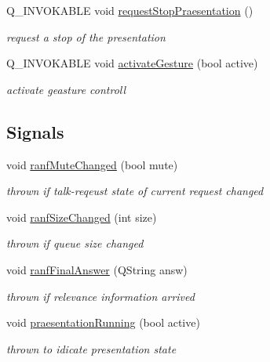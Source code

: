 \begin{DoxyCompactItemize}
Q\+\_\+\+I\+N\+V\+O\+K\+A\+B\+L\+E void \hyperlink{class_master_client_a49b98e7c910dc92d3b189199251996a8}{request\+Stop\+Praesentation} ()
\begin{DoxyCompactList}\small\item\em request a stop of the presentation \end{DoxyCompactList}\item 
Q\+\_\+\+I\+N\+V\+O\+K\+A\+B\+L\+E void \hyperlink{class_master_client_acf6776f3da0028d63f3d01cbc2f1c6bb}{activate\+Gesture} (bool active)
\begin{DoxyCompactList}\small\item\em activate geasture controll \end{DoxyCompactList}\end{DoxyCompactItemize}
\subsection*{Signals}
\begin{DoxyCompactItemize}
\item 
void \hyperlink{class_master_client_ae959ff9f0dac110f6a99c08746894167}{ranf\+Mute\+Changed} (bool mute)
\begin{DoxyCompactList}\small\item\em thrown if talk-\/reqeust state of current request changed \end{DoxyCompactList}\item 
void \hyperlink{class_master_client_a0a9db9f1554d0b2a85ae751f28be1012}{ranf\+Size\+Changed} (int size)
\begin{DoxyCompactList}\small\item\em thrown if queue size changed \end{DoxyCompactList}\item 
void \hyperlink{class_master_client_a21fd226ba53d129f9a07fb182cf020b9}{ranf\+Final\+Answer} (Q\+String answ)
\begin{DoxyCompactList}\small\item\em thrown if relevance information arrived \end{DoxyCompactList}\item 
void \hyperlink{class_master_client_a7bb0cc52809d0311c1ac835319a77c2c}{praesentation\+Running} (bool active)
\begin{DoxyCompactList}\small\item\em thrown to idicate presentation state \end{DoxyCompactList}\end{DoxyCompactItemize}
